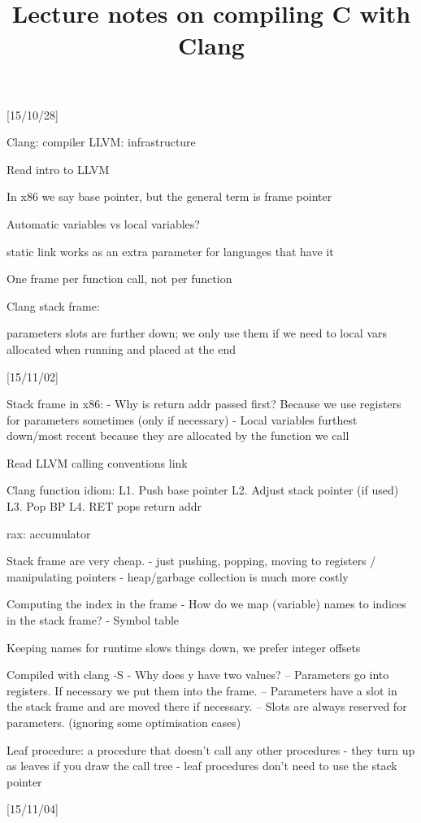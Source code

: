 \documentclass{article}
\title{Lecture notes on compiling C with Clang}
\begin{document}
\maketitle

[15/10/28]

Clang: compiler
LLVM: infrastructure

Read intro to LLVM

In x86 we say base pointer, but the general term is frame pointer

Automatic variables vs local variables?

static link works as an extra parameter for languages that have it

One frame per function call, not per function

Clang stack frame:

parameters slots are further down; we only use them if we need to
local vars allocated when running and placed at the end

[15/11/02]

Stack frame in x86:
- Why is return addr passed first? Because we use registers for parameters sometimes (only if necessary)
- Local variables furthest down/most recent because they are allocated by the function we call

Read LLVM calling conventions link

Clang function idiom:
L1. Push base pointer
L2. Adjust stack pointer (if used)
L3. Pop BP
L4. RET pops return addr

rax: accumulator

Stack frame are very cheap.
- just pushing, popping, moving to registers / manipulating pointers
- heap/garbage collection is much more costly

Computing the index in the frame
- How do we map (variable) names to indices in the stack frame?
- Symbol table

Keeping names for runtime slows things down, we prefer integer offsets

Compiled with clang -S
- Why does y have two values?
-- Parameters go into registers. If necessary we put them into the frame.
-- Parameters have a slot in the stack frame and are moved there if necessary.
-- Slots are always reserved for parameters. (ignoring some optimisation cases)

Leaf procedure: a procedure that doesn't call any other procedures
- they turn up as leaves if you draw the call tree
- leaf procedures don't need to use the stack pointer

[15/11/04]
\end{document}
